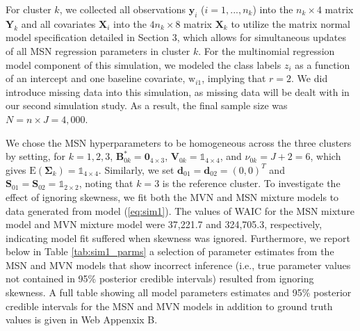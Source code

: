 \documentclass[useAMS,referee]{biom}
\begin{document}
For cluster $k$, we collected all observations $\mathbf{y}_i$ ($i = 1,...,n_k$) into the $n_k \times 4$ matrix $\mathbf{Y}_k$ and all covariates $\mathbf{X}_i$ into the $4n_k \times 8$ matrix $\mathbf{X}_k$ to utilize the matrix normal model specification detailed in Section 3, which allows for simultaneous updates of all MSN regression parameters in cluster $k$. For the multinomial regression model component of this simulation, we modeled the class labels $z_i$ as a function of an intercept and one baseline covariate, $\text{w}_{i1}$, implying that $r = 2$. We did introduce missing data into this simulation, as missing data will be dealt with in our second simulation study. As a result, the final sample size was $N = n \times J = 4,000$.

We chose the MSN hyperparameters to be homogeneous across the three clusters by setting, for $k = 1,2,3$, $\mathbf{B}_{0k}^* = \mathbf{0}_{4 \times 3}$, $\mathbf{V}_{0k} = \mathds{1}_{4 \times 4}$, and $\nu_{0k} = J + 2 = 6$, which gives $\text{E}(\boldsymbol\Sigma_k) = \mathds{1}_{4 \times 4}$. Similarly, we set $\mathbf{d}_{01} = \mathbf{d}_{02} = (0,0)^T$ and $\mathbf{S}_{01} = \mathbf{S}_{02} = \mathds{1}_{2 \times 2}$, noting that $k = 3$ is the reference cluster. To investigate the effect of ignoring skewness, we fit both the MVN and MSN mixture models to data generated from model (\ref{eq:sim1}). The values of WAIC for the MSN mixture model and MVN mixture model were 37,221.7 and 324,705.3, respectively, indicating model fit suffered when skewness was ignored. Furthermore, we report below in Table \ref{tab:sim1_parms} a selection of parameter estimates from the MSN and MVN models that show incorrect inference (i.e., true parameter values not contained in 95\% posterior credible intervals) resulted from ignoring skewness. A full table showing all model parameters estimates and 95\% posterior credible intervals for the MSN and MVN models in addition to ground truth values is given in Web Appenxix B.
\end{document}
